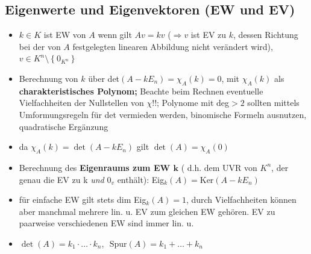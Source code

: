 \documentclass[10pt,a4paper]{article}
\begin{document}
\subsection{Eigenwerte und Eigenvektoren (EW und EV)}
\begin{itemize}
\item $k\in K$ ist EW von $A$ wenn gilt $Av=kv$ ($\Rightarrow v$ ist EV zu $k$, dessen Richtung bei der von $A$ festgelegten linearen Abbildung nicht verändert wird), $v\in K^{n}\setminus \left\lbrace 0_{K^{n}}\right\rbrace$
\item Berechnung von $k$ über det$(A-kE_{n})=\chi_{A}(k)=0$, mit $\chi_{A}(k)$ als \textbf{charakteristisches Polynom;} Beachte beim Rechnen eventuelle Vielfachheiten der Nullstellen von $\chi$!!; Polynome mit deg$>2$ sollten mittels  Umformungsregeln für det vermieden werden, binomische Formeln ausnutzen, quadratische Ergänzung
\item da $\chi_{A}(k)=\det (A-kE_{n})$ gilt $\det(A)=\chi_{A}(0)$
\item Berechnung des \textbf{Eigenraums zum EW $\boldsymbol{k}$} ( d.h. dem UVR von $K^{n}$, der genau die EV zu k \textit{und} $0_{v}$ enthält): Eig$_{k}(A)=\text{Ker}(A-kE_{n})$
\item für einfache EW gilt stets dim Eig$_{k}(A)=1$, durch Vielfachheiten können aber manchmal mehrere lin. u. EV zum gleichen EW gehören. EV zu paarweise verschiedenen EW sind immer lin. u.
\item $\det(A)=k_{1}\cdot \dotsc \cdot k_{n}$, $\text{ Spur}(A)=k_{1}+\dotsc +k_{n}$
\end{itemize}
\end{document}

